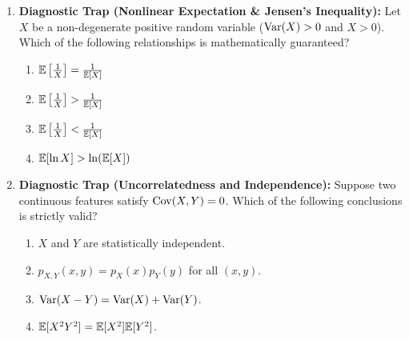 \begin{enumerate}[resume]
\item \textbf{Diagnostic Trap (Nonlinear Expectation \& Jensen's Inequality):}
Let $X$ be a non-degenerate positive random variable ($\operatorname{Var}(X) > 0$ and $X > 0$). Which of the following relationships is mathematically guaranteed?
\begin{enumerate}
    \item $\mathbb{E}\left[\frac{1}{X}\right] = \frac{1}{\mathbb{E}[X]}$
    \item $\mathbb{E}\left[\frac{1}{X}\right] > \frac{1}{\mathbb{E}[X]}$
    \item $\mathbb{E}\left[\frac{1}{X}\right] < \frac{1}{\mathbb{E}[X]}$
    \item $\mathbb{E}[\ln X] > \ln(\mathbb{E}[X])$
\end{enumerate}

\item \textbf{Diagnostic Trap (Uncorrelatedness and Independence):}
Suppose two continuous features satisfy $\operatorname{Cov}(X, Y) = 0$. Which of the following conclusions is strictly valid?
\begin{enumerate}
    \item $X$ and $Y$ are statistically independent.
    \item $p_{X,Y}(x, y) = p_X(x) p_Y(y)$ for all $(x, y)$.
    \item $\operatorname{Var}(X - Y) = \operatorname{Var}(X) + \operatorname{Var}(Y)$.
    \item $\mathbb{E}[X^2 Y^2] = \mathbb{E}[X^2] \mathbb{E}[Y^2]$.
\end{enumerate}
\end{enumerate}
